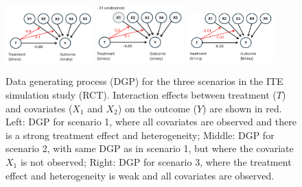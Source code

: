 \begin{figure}[H]
\centering
\includegraphics[width=0.3\textwidth]{img/results_ITE_simulation/simulation_observed.png}
\includegraphics[width=0.3\textwidth]{img/results_ITE_simulation/simulation_unobserved.png}
\includegraphics[width=0.3\textwidth]{img/results_ITE_simulation/simulation_small_effects.png}
\caption{Data generating process (DGP) for the three scenarios in the ITE simulation study (RCT). Interaction effects between treatment ($T$) and covariates ($X_1$ and $X_2$) on the outcome ($Y$) are shown in red. Left: DGP for scenario 1, where all covariates are observed and there is a strong treatment effect and heterogeneity; Middle: DGP for scenario 2, with same DGP as in scenario 1, but where the covariate $X_1$ is not observed; Right: DGP for scenario 3, where the treatment effect and heterogeneity is weak and all covariates are observed.}
\label{fig:simulation_dags}
\end{figure}








